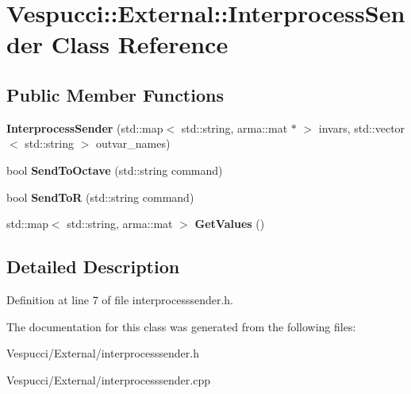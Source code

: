 \hypertarget{class_vespucci_1_1_external_1_1_interprocess_sender}{}\section{Vespucci\+:\+:External\+:\+:Interprocess\+Sender Class Reference}
\label{class_vespucci_1_1_external_1_1_interprocess_sender}
\subsection*{Public Member Functions}
\begin{DoxyCompactItemize}
\item 
{\bfseries Interprocess\+Sender} (std\+::map$<$ std\+::string, arma\+::mat $\ast$ $>$ invars, std\+::vector$<$ std\+::string $>$ outvar\+\_\+names)\hypertarget{class_vespucci_1_1_external_1_1_interprocess_sender_aea180357ec2e0b47d4077e8781a96873}{}\label{class_vespucci_1_1_external_1_1_interprocess_sender_aea180357ec2e0b47d4077e8781a96873}

\item 
bool {\bfseries Send\+To\+Octave} (std\+::string command)\hypertarget{class_vespucci_1_1_external_1_1_interprocess_sender_a6c76ed36f384c8369cc2a5da45888d99}{}\label{class_vespucci_1_1_external_1_1_interprocess_sender_a6c76ed36f384c8369cc2a5da45888d99}

\item 
bool {\bfseries Send\+ToR} (std\+::string command)\hypertarget{class_vespucci_1_1_external_1_1_interprocess_sender_ac1e68c293b66eb376ef006a64acc4665}{}\label{class_vespucci_1_1_external_1_1_interprocess_sender_ac1e68c293b66eb376ef006a64acc4665}

\item 
std\+::map$<$ std\+::string, arma\+::mat $>$ {\bfseries Get\+Values} ()\hypertarget{class_vespucci_1_1_external_1_1_interprocess_sender_a0954ee3010a9020791eb32c5fb9343b9}{}\label{class_vespucci_1_1_external_1_1_interprocess_sender_a0954ee3010a9020791eb32c5fb9343b9}

\end{DoxyCompactItemize}


\subsection{Detailed Description}


Definition at line 7 of file interprocesssender.\+h.



The documentation for this class was generated from the following files\+:\begin{DoxyCompactItemize}
\item 
Vespucci/\+External/interprocesssender.\+h\item 
Vespucci/\+External/interprocesssender.\+cpp\end{DoxyCompactItemize}
